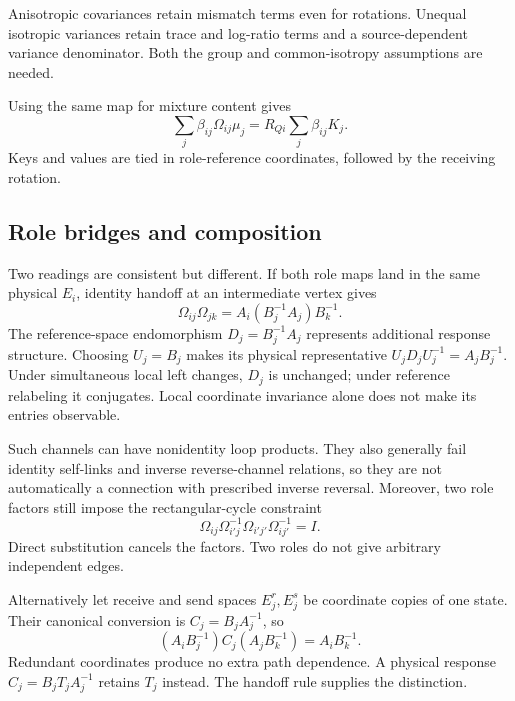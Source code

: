 \documentclass[11pt,letterpaper]{article}
\theoremstyle{remark}
\begin{document}
Anisotropic covariances retain mismatch terms even for rotations. Unequal isotropic variances retain trace and log-ratio terms and a source-dependent variance denominator. Both the group and common-isotropy assumptions are needed.

Using the same map for mixture content gives
\begin{equation}
 \sum_j\beta_{ij}\Omega_{ij}\mu_j
 =R_{Qi}\sum_j\beta_{ij}K_j.
 \label{eq:so-value}
\end{equation}
Keys and values are tied in role-reference coordinates, followed by the receiving rotation.

\subsection{Role bridges and composition}
\label{sec:bridges}
Two readings are consistent but different. If both role maps land in the same physical $E_i$, identity handoff at an intermediate vertex gives
\begin{equation}
 \Omega_{ij}\Omega_{jk}=A_i(B_j^{-1}A_j)B_k^{-1}.
\end{equation}
The reference-space endomorphism $D_j=B_j^{-1}A_j$ represents additional response structure. Choosing $U_j=B_j$ makes its physical representative $U_jD_jU_j^{-1}=A_jB_j^{-1}$. Under simultaneous local left changes, $D_j$ is unchanged; under reference relabeling it conjugates. Local coordinate invariance alone does not make its entries observable.

Such channels can have nonidentity loop products. They also generally fail identity self-links and inverse reverse-channel relations, so they are not automatically a connection with prescribed inverse reversal. Moreover, two role factors still impose the rectangular-cycle constraint
\begin{equation}
 \Omega_{ij}\Omega_{i'j}^{-1}\Omega_{i'j'}\Omega_{ij'}^{-1}=I.
 \label{eq:rectangle}
\end{equation}
Direct substitution cancels the factors. Two roles do not give arbitrary independent edges.

Alternatively let receive and send spaces $E_j^r,E_j^s$ be coordinate copies of one state. Their canonical conversion is $C_j=B_jA_j^{-1}$, so
\begin{equation}
 (A_iB_j^{-1})C_j(A_jB_k^{-1})=A_iB_k^{-1}.
\end{equation}
Redundant coordinates produce no extra path dependence. A physical response $C_j=B_jT_jA_j^{-1}$ retains $T_j$ instead. The handoff rule supplies the distinction.
\end{document}
